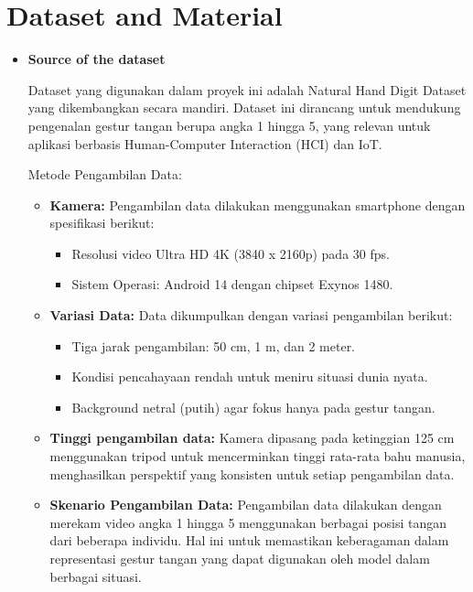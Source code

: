 \documentclass[12pt,a4paper]{article}
\begin{document}
\section{\uppercase Dataset and Material}
\begin{itemize}
    \item  \textbf {Source of the dataset}
    
    \hspace{0.5cm} Dataset yang digunakan dalam proyek ini adalah Natural Hand Digit Dataset yang dikembangkan secara mandiri. Dataset ini dirancang untuk mendukung pengenalan gestur tangan berupa angka 1 hingga 5, yang relevan untuk aplikasi berbasis Human-Computer Interaction (HCI) dan IoT.

    Metode Pengambilan Data:

    \begin{itemize}
    \item \textbf{Kamera:} Pengambilan data dilakukan menggunakan smartphone dengan spesifikasi berikut:
    \begin{itemize}
        \item Resolusi video Ultra HD 4K (3840 x 2160p) pada 30 fps.
        \item Sistem Operasi: Android 14 dengan chipset Exynos 1480.
    \end{itemize}
    
    \item \textbf{Variasi Data:} Data dikumpulkan dengan variasi pengambilan berikut:
    \begin{itemize}
        \item Tiga jarak pengambilan: 50 cm, 1 m, dan 2 meter.
        \item Kondisi pencahayaan rendah untuk meniru situasi dunia nyata.
        \item Background netral (putih) agar fokus hanya pada gestur tangan.
    \end{itemize}

    \item \textbf{Tinggi pengambilan data:} Kamera dipasang pada ketinggian 125 cm menggunakan tripod untuk mencerminkan tinggi rata-rata bahu manusia, menghasilkan perspektif yang konsisten untuk setiap pengambilan data.

    \item \textbf{Skenario Pengambilan Data:} Pengambilan data dilakukan dengan merekam video angka 1 hingga 5 menggunakan berbagai posisi tangan dari beberapa individu. Hal ini untuk memastikan keberagaman dalam representasi gestur tangan yang dapat digunakan oleh model dalam berbagai situasi.


\end{itemize}
\end{itemize}
\end{document}
